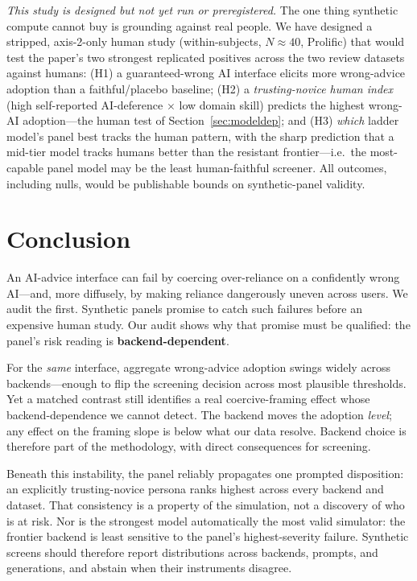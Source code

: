\documentclass[manuscript,nonacm]{acmart}
\begin{document}
\emph{This study is designed but not yet run or preregistered.} The one thing synthetic compute cannot buy
is grounding against real people. We have designed a stripped, axis-2-only human study (within-subjects,
$N\approx 40$, Prolific) that would test the paper's two strongest replicated positives across the two
review datasets against
humans: (H1) a guaranteed-wrong AI interface elicits more wrong-advice adoption than a faithful/placebo
baseline; (H2) a \emph{trusting-novice human index} (high self-reported AI-deference $\times$ low domain
skill) predicts the highest wrong-AI adoption---the human test of Section~\ref{sec:modeldep}; and (H3)
\emph{which} ladder model's panel best tracks the human pattern, with the sharp prediction that a mid-tier
model tracks humans better than the resistant frontier---i.e.\ the most-capable panel model may be the
least human-faithful screener. All outcomes, including nulls, would be publishable bounds on
synthetic-panel validity.

\section{Conclusion}

An AI-advice interface can fail by coercing over-reliance on a confidently wrong AI---and, more diffusely,
by making reliance dangerously uneven across users. We audit the first. Synthetic panels promise to catch
such failures before an expensive
human study. Our audit shows why that promise must be qualified: the panel's risk reading is
\textbf{backend-dependent}.

For the \emph{same} interface, aggregate wrong-advice adoption swings widely across backends---enough to
flip the screening decision across most plausible thresholds. Yet a matched contrast still identifies a
real coercive-framing effect whose backend-dependence we cannot detect. The backend moves the
adoption \emph{level}; any effect on the framing slope is below what our data resolve. Backend choice is
therefore part of the methodology, with direct consequences for screening.

Beneath this instability, the panel reliably propagates one prompted disposition: an explicitly
trusting-novice persona ranks highest across every backend and dataset. That consistency is a property of
the simulation, not a discovery of who is at risk. Nor is the strongest model automatically the most valid
simulator: the frontier backend is least sensitive to the panel's highest-severity failure. Synthetic
screens should therefore report distributions across backends, prompts, and generations, and abstain when
their instruments disagree.
\end{document}
